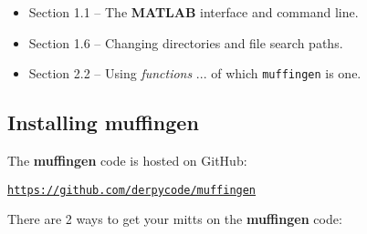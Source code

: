 \documentclass[11pt,fleqn]{book} %
\begin{document}
\vspace{2mm}
\begin{itemize}[noitemsep]
\item Section 1.1 -- The \textbf{MATLAB} interface and command line.
\item Section 1.6 -- Changing directories and file search paths.
\item Section 2.2 -- Using \textit{functions} ... of which \texttt{muffingen} is one.
\end{itemize}
\vspace{2mm}


\subsection{Installing muffingen}

The \textbf{muffingen} code is hosted on GitHub:

\vspace{2mm}
\href{https://github.com/derpycode/muffingen}{\texttt{https://github.com/derpycode/muffingen}}
\vspace{2mm}

There are 2 ways to get your mitts on the \textbf{muffingen} code:
\end{document}
